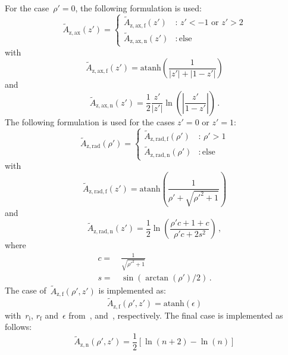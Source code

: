 For the case~$\rho'=0$, the following formulation is used:
\begin{equation}
  \tilde{A}_\mathrm{z,ax} (z') =
  \begin{cases}
    \tilde{A}_\mathrm{z,ax,f} (z') &:\, z' < -1 \textrm{ or } z' > 2 \\
    \tilde{A}_\mathrm{z,ax,n} (z') &:\, \textrm{else}
  \end{cases}
\end{equation}
with
\begin{equation}
  \tilde{A}_\mathrm{z,ax,f} (z') = \textrm{atanh}\left( \frac{1}{|z'| + |1 - z'|} \right)
\end{equation}
and
\begin{equation}
  \tilde{A}_\mathrm{z,ax,n} (z') = \frac{1}{2} \frac{z'}{|z'|} \ln \left(\left| \frac{z'}{1 - z'} \right| \right) \, .
\end{equation}
The following formulation is used for the cases $z'=0$ or $z'=1$:
\begin{equation}
  \tilde{A}_\mathrm{z,rad} (\rho') =
  \begin{cases}
    \tilde{A}_\mathrm{z,rad,f} (\rho')  &:\, \rho' > 1 \\
    \tilde{A}_\mathrm{z,rad,n} (\rho') &:\, \textrm{else}
  \end{cases}
\end{equation}
with
\begin{equation}
  \tilde{A}_\mathrm{z,rad,f} (z') = \textrm{atanh}\left( \frac{1}{\rho' + \sqrt{{\rho'}^2 + 1}} \right)
\end{equation}
and
\begin{equation}
  \tilde{A}_\mathrm{z,rad,n} (z') = \frac{1}{2} \ln \left(\frac{\rho' c + 1 + c}{\rho' c + 2 s^2 }\right) \, ,
\end{equation}
where
\begin{align}
  c =&\, \frac{1}{\sqrt{{\rho'}^2 + 1}} \\
  s =&\, \sin(\arctan(\rho')/2) \, .
\end{align}
The case of~$\tilde{A}_\mathrm{z,f}(\rho', z')$ is implemented as:
\begin{equation}
  \tilde{A}_\mathrm{z,f}(\rho', z') = \textrm{atanh} (\epsilon)
\end{equation}
with~$r_\mathrm{i}$, $r_\mathrm{f}$ and~$\epsilon$ from~,  and~, respectively.
The final case is implemented as follows:
\begin{equation}
  \tilde{A}_\mathrm{z,n} (\rho', z') = \frac{1}{2} \left[ \ln\left(n + 2 \right) - \ln \left( n \right)  \right]
\end{equation}
